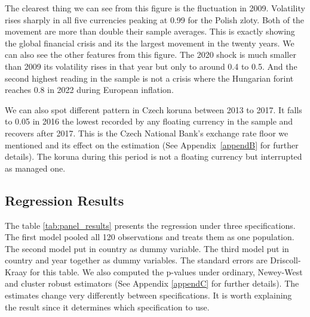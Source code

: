 \vspace{\baselineskip}

The clearest thing we can see from this figure is the fluctuation in 2009.
Volatility rises sharply in all five currencies peaking at 0.99 for the Polish zloty.
Both of the movement are more than double their sample averages.
This is exactly showing the global financial crisis and its the largest movement in the twenty years.
We can also see the other features from this figure.
The 2020 shock is much smaller than 2009 its volatility rises in that year but only to around 0.4 to 0.5.
And the second highest reading in the sample is not a crisis where the Hungarian forint reaches 0.8 in 2022 during European inflation.

\vspace{\baselineskip}

We can also spot different pattern in Czech koruna between 2013 to 2017.
It falls to 0.05 in 2016 the lowest recorded by any floating currency in the sample and recovers after 2017.
This is the Czech National Bank's exchange rate floor we mentioned and its effect on the estimation (See Appendix~\ref{appendB} for further details).
The koruna during this period is not a floating currency but interrupted as managed one.


\subsection{Regression Results}\label{subsec:panel}




The table \ref{tab:panel_results} presents the regression under three specifications.
The first model pooled all 120 observations and treats them as one population.
The second model put in country as dummy variable.
The third model put in country and year together as dummy variables.
The standard errors are Driscoll-Kraay for this table.
We also computed the p-values under ordinary, Newey-West and cluster robust estimators (See Appendix \ref{appendC} for further details).
The estimates change very differently between specifications.
It is worth explaining the result since it determines which specification to use.

